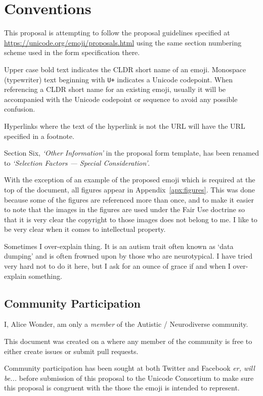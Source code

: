 \section*{Conventions}

This proposal is attempting to follow the proposal guidelines specified at
\url{https://unicode.org/emoji/proposals.html} using the same section numbering
scheme used in the form specification there.

Upper case bold text indicates the CLDR short name of an emoji. Monospace (typewriter)
text beginning with \texttt{U+} indicates a Unicode codepoint. When referencing a CLDR
short name for an existing emoji, usually it will be accompanied with the Unicode
codepoint or sequence to avoid any possible confusion.

Hyperlinks where the text of the hyperlink is not the URL will have the URL specified
in a footnote.

Section Six, \textit{`Other Information'} in the proposal form template, has been renamed to
\textit{`Selection Factors --- Special Consideration'}.

With the exception of an example of the proposed emoji which is required at the top of
the document, all figures appear in Appendix~\ref{apx:figures}. This was done because
some of the figures are referenced more than once, and to make it easier to note that
the images in the figures are used under the Fair Use doctrine so that it is very
clear the copyright to those images does not belong to me. I like to be very clear
when it comes to intellectual property.

Sometimes I over-explain thing. It is an autism trait often known as `data dumping' and
is often frowned upon by those who are neurotypical. I have tried very hard not to do
it here, but I ask for an ounce of grace if and when I over-explain something.

\subsection*{Community Participation}

I, Alice Wonder, am only a \emph{member} of the Autistic / Neurodiverse community.

This document was created on a
where any member of the community is free to either create issues or submit pull
requests.

Community participation has been sought at both Twitter and Facebook \emph{er, will be...}
before submission of this proposal to the Unicode Consortium to make sure this proposal is
congruent with the those the emoji is intended to represent.

